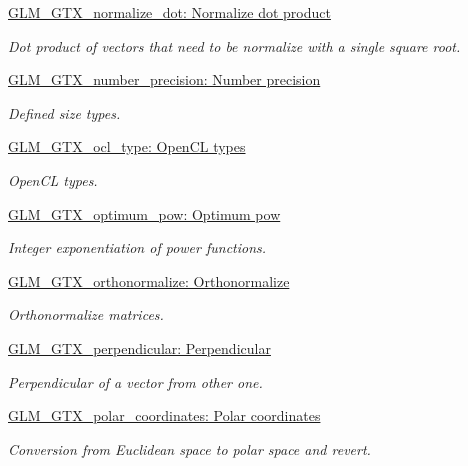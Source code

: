 \begin{DoxyCompactItemize}
\hyperlink{group__gtx__normalize__dot}{\-G\-L\-M\-\_\-\-G\-T\-X\-\_\-normalize\-\_\-dot\-: Normalize dot product}
\begin{DoxyCompactList}\small\item\em \-Dot product of vectors that need to be normalize with a single square root. \end{DoxyCompactList}\item 
\hyperlink{group__gtx__number__precision}{\-G\-L\-M\-\_\-\-G\-T\-X\-\_\-number\-\_\-precision\-: Number precision}
\begin{DoxyCompactList}\small\item\em \-Defined size types. \end{DoxyCompactList}\item 
\hyperlink{group__gtx__ocl__type}{\-G\-L\-M\-\_\-\-G\-T\-X\-\_\-ocl\-\_\-type\-: Open\-C\-L types}
\begin{DoxyCompactList}\small\item\em \-Open\-C\-L types. \end{DoxyCompactList}\item 
\hyperlink{group__gtx__optimum__pow}{\-G\-L\-M\-\_\-\-G\-T\-X\-\_\-optimum\-\_\-pow\-: Optimum pow}
\begin{DoxyCompactList}\small\item\em \-Integer exponentiation of power functions. \end{DoxyCompactList}\item 
\hyperlink{group__gtx__orthonormalize}{\-G\-L\-M\-\_\-\-G\-T\-X\-\_\-orthonormalize\-: Orthonormalize}
\begin{DoxyCompactList}\small\item\em \-Orthonormalize matrices. \end{DoxyCompactList}\item 
\hyperlink{group__gtx__perpendicular}{\-G\-L\-M\-\_\-\-G\-T\-X\-\_\-perpendicular\-: Perpendicular}
\begin{DoxyCompactList}\small\item\em \-Perpendicular of a vector from other one. \end{DoxyCompactList}\item 
\hyperlink{group__gtx__polar__coordinates}{\-G\-L\-M\-\_\-\-G\-T\-X\-\_\-polar\-\_\-coordinates\-: Polar coordinates}
\begin{DoxyCompactList}\small\item\em \-Conversion from \-Euclidean space to polar space and revert. \end{DoxyCompactList}\item 

\end{DoxyCompactItemize}
